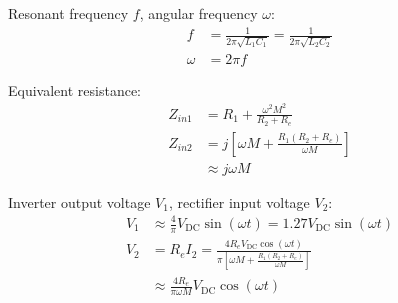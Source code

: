 \documentclass[8pt]{innovativeinnovation-cheatsheet}
\def\coord(#1){coordinate(#1)}
\def\coord(#1){coordinate(#1) node[circle, red, draw, inner sep=1pt, pin={[red, overlay, inner sep=0.5pt, font=\tiny, pin distance=0.1cm, pin edge={red, overlay,-}]45:#1}](#1-node){}}
\begin{document}
\begin{multicols*}{3}


\begin{center}
\centering
{}
\end{center}

Resonant frequency $f$, angular frequency $\omega$:
\begin{equation*}
\begin{aligned}
f &= \frac{1}{2 \pi \sqrt{L_1 C_1}} = \frac{1}{2 \pi \sqrt{L_2 C_2}}\\
\omega &= 2 \pi f
\end{aligned}
\end{equation*}

\begin{multicols*}{2}
    
Equivalent resistance:
\begin{equation*}
\begin{aligned}
Z_{in1} & = R_1 + \frac{\omega^2 M^2}{R_2 +R_e}\\
Z_{in2} & = j \left[ \omega M + \frac{R_1 (R_2 + R_e)}{\omega M} \right]\\
&\approx j\omega M
\end{aligned}
\end{equation*}

\columnbreak

Inverter output voltage $V_1$, rectifier input voltage $V_2$:
\begin{equation*}
\begin{aligned}
V_1 &\approx \frac4\pi V_{\text{DC}} \sin (\omega t) = 1.27 V_{\text{DC}}\sin(\omega t)\\
V_2 & = R_e I_2 = \frac{4 R_e V_{\text{DC}} \cos (\omega t) }{\pi \left[ \omega M + \frac{R_1 (R_2 + R_e)}{\omega M} \right]} \\
& \approx \frac{4 R_e}{\pi \omega M} V_{\text{DC}}\cos(\omega t)
\end{aligned}
\end{equation*}
\end{multicols*}


\end{multicols*}
\end{document}
